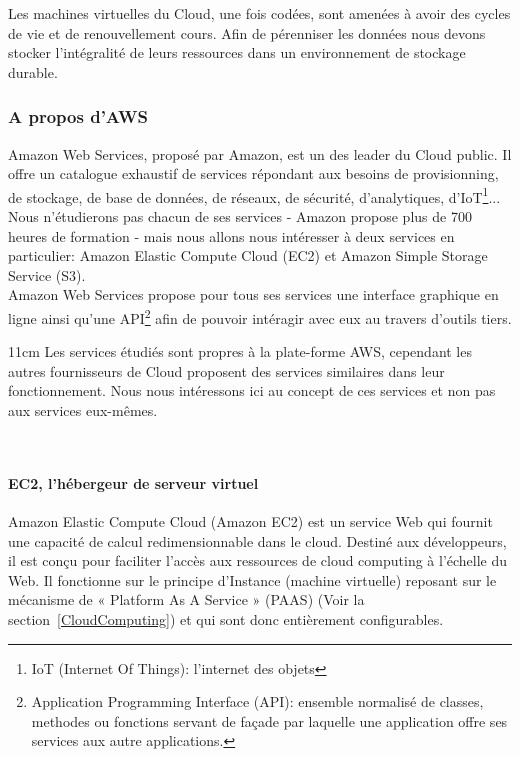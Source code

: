       Les machines virtuelles du Cloud, une fois codées, sont amenées à avoir des cycles de vie et de renouvellement cours. Afin de pérenniser les données nous devons stocker l'intégralité de leurs ressources dans un environnement de stockage durable.

        \subsubsection{A propos d'AWS}
        Amazon Web Services, proposé par Amazon, est un des leader du Cloud public. Il offre un catalogue exhaustif de services répondant aux besoins de provisionning, de stockage, de base de données, de réseaux, de sécurité, d'analytiques, d'IoT\footnote{IoT (Internet Of Things): l'internet des objets}... Nous n'étudierons pas chacun de ses services - Amazon propose plus de 700 heures de formation - mais nous allons nous intéresser à deux services en particulier: Amazon Elastic Compute Cloud (EC2) et Amazon Simple Storage Service (S3).\\

        Amazon Web Services propose pour tous ses services une interface graphique en ligne ainsi qu'une API\footnote{Application Programming Interface (API): ensemble normalisé de classes, methodes ou fonctions servant de façade par laquelle une application offre ses services aux autre applications.} afin de pouvoir intéragir avec eux au travers d'outils tiers.\\

        \begin {boxedminipage} {11cm}
          Les services étudiés sont propres à la plate-forme AWS, cependant les autres fournisseurs de Cloud proposent des services similaires dans leur fonctionnement. Nous nous intéressons ici au concept de ces services et non pas aux services eux-mêmes.
        \end {boxedminipage}\\

          \paragraph{EC2, l'hébergeur de serveur virtuel}
          Amazon Elastic Compute Cloud (Amazon EC2) est un service Web qui fournit une capacité de calcul redimensionnable dans le cloud. Destiné aux développeurs, il est conçu pour faciliter l'accès aux ressources de cloud computing à l'échelle du Web. Il fonctionne sur le principe d'Instance (machine virtuelle) reposant sur le mécanisme de « Platform As A Service » (PAAS) (Voir la section~\ref{CloudComputing}) et qui sont donc entièrement configurables.

